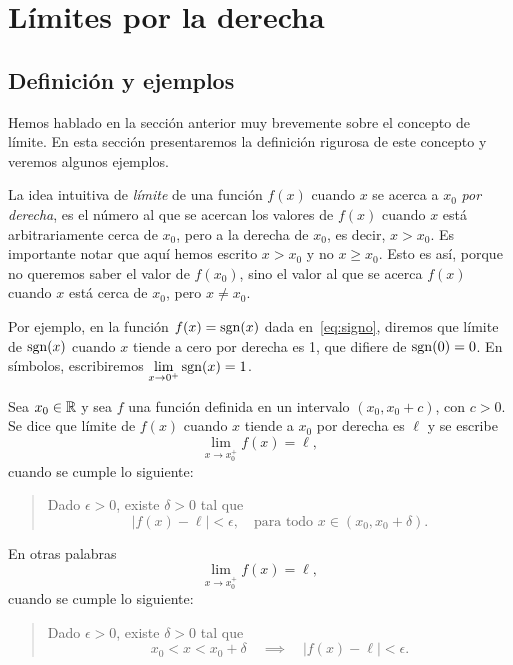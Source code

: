 \begin{enumerate}

\end{enumerate}


\section{Límites por la derecha}

\subsection{Definición y ejemplos}

Hemos hablado en la sección anterior muy brevemente sobre el concepto de límite. En esta sección presentaremos la definición rigurosa de este concepto y veremos algunos ejemplos.

La idea intuitiva de \emph{límite} de una función $f(x)$ cuando $x$ se acerca a $x_0$ \emph{por derecha}, es el número al que se acercan los valores de $f(x)$ cuando $x$ está arbitrariamente cerca de $x_0$, pero a la derecha de $x_0$, es decir, $x>x_0$. Es importante notar que aquí hemos escrito $x>x_0$ y no $x\ge x_0$. Esto es así, porque no queremos saber el valor de $f(x_0)$, sino el valor al que se acerca $f(x)$ cuando $x$ está cerca de $x_0$, pero $x\neq x_0$.

Por ejemplo, en la función $f(x)=\operatorname{sgn}(x)$ dada en~\eqref{eq:signo}, diremos que límite de $\operatorname{sgn}(x)$ cuando $x$ tiende a cero por derecha es 1, que difiere de $\operatorname{sgn}(0)=0$. En símbolos, escribiremos $\displaystyle\lim_{x\to0^+} \operatorname{sgn}(x)=1$.

\begin{definition}
    Sea $x_0\in\mathbb{R}$ y sea $f$ una función definida en un intervalo $(x_0,x_0+c)$, con $c>0$. Se dice que límite de $f(x)$ cuando $x$ tiende a $x_0$ por derecha es $\ell$ y se escribe
    \[
    \lim_{x\to x_0^+}f(x)=\ell,
    \]
    cuando se cumple lo siguiente:
    \begin{quote}
        Dado $\epsilon > 0$, existe $\delta > 0$ tal que 
        \[
        |f(x)-\ell| < \epsilon, \quad\text{para todo $x\in (x_0,x_0+\delta)$}
        .
        \]
    \end{quote}
\end{definition}
    
\begin{remark}
    En otras palabras
    \[
    \lim_{x\to x_0^+}f(x)=\ell,
    \]
    cuando se cumple lo siguiente:
    \begin{quote}
        Dado $\epsilon > 0$, existe $\delta > 0$ tal que 
        \[
        x_0<x<x_0+\delta
        \quad\implies\quad |f(x)-\ell| < \epsilon.
        \]
    \end{quote}
\end{remark}

